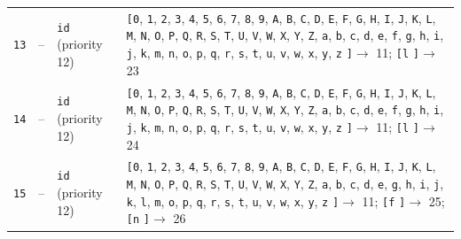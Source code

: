\documentclass[11pt,a4paper]{article}
\newcommand{\opensymbolset}{\texttt{[}}
\newcommand{\closesymbolset}{\texttt{]}}
\begin{document}
\begin{landscape}
\begin{longtable}{
    >{\centering\arraybackslash}p{0.8cm}
    >{\centering\arraybackslash}p{0.7cm}
    >{\raggedright\arraybackslash}p{3.7cm}
    >{\raggedright\arraybackslash}p{18.1cm}
}
\texttt{13} & -- & \texttt{id} (priority 12) & \opensymbolset \texttt{0}, \texttt{1}, \texttt{2}, \texttt{3}, \texttt{4}, \texttt{5}, \texttt{6}, \texttt{7}, \texttt{8}, \texttt{9}, \texttt{A}, \texttt{B}, \texttt{C}, \texttt{D}, \texttt{E}, \texttt{F}, \texttt{G}, \texttt{H}, \texttt{I}, \texttt{J}, \texttt{K}, \texttt{L}, \texttt{M}, \texttt{N}, \texttt{O}, \texttt{P}, \texttt{Q}, \texttt{R}, \texttt{S}, \texttt{T}, \texttt{U}, \texttt{V}, \texttt{W}, \texttt{X}, \texttt{Y}, \texttt{Z}, \texttt{a}, \texttt{b}, \texttt{c}, \texttt{d}, \texttt{e}, \texttt{f}, \texttt{g}, \texttt{h}, \texttt{i}, \texttt{j}, \texttt{k}, \texttt{m}, \texttt{n}, \texttt{o}, \texttt{p}, \texttt{q}, \texttt{r}, \texttt{s}, \texttt{t}, \texttt{u}, \texttt{v}, \texttt{w}, \texttt{x}, \texttt{y}, \texttt{z} \closesymbolset $\to$ 11; \opensymbolset \texttt{l} \closesymbolset $\to$ 23 \\
\texttt{14} & -- & \texttt{id} (priority 12) & \opensymbolset \texttt{0}, \texttt{1}, \texttt{2}, \texttt{3}, \texttt{4}, \texttt{5}, \texttt{6}, \texttt{7}, \texttt{8}, \texttt{9}, \texttt{A}, \texttt{B}, \texttt{C}, \texttt{D}, \texttt{E}, \texttt{F}, \texttt{G}, \texttt{H}, \texttt{I}, \texttt{J}, \texttt{K}, \texttt{L}, \texttt{M}, \texttt{N}, \texttt{O}, \texttt{P}, \texttt{Q}, \texttt{R}, \texttt{S}, \texttt{T}, \texttt{U}, \texttt{V}, \texttt{W}, \texttt{X}, \texttt{Y}, \texttt{Z}, \texttt{a}, \texttt{b}, \texttt{c}, \texttt{d}, \texttt{e}, \texttt{f}, \texttt{g}, \texttt{h}, \texttt{i}, \texttt{j}, \texttt{k}, \texttt{m}, \texttt{n}, \texttt{o}, \texttt{p}, \texttt{q}, \texttt{r}, \texttt{s}, \texttt{t}, \texttt{u}, \texttt{v}, \texttt{w}, \texttt{x}, \texttt{y}, \texttt{z} \closesymbolset $\to$ 11; \opensymbolset \texttt{l} \closesymbolset $\to$ 24 \\
\texttt{15} & -- & \texttt{id} (priority 12) & \opensymbolset \texttt{0}, \texttt{1}, \texttt{2}, \texttt{3}, \texttt{4}, \texttt{5}, \texttt{6}, \texttt{7}, \texttt{8}, \texttt{9}, \texttt{A}, \texttt{B}, \texttt{C}, \texttt{D}, \texttt{E}, \texttt{F}, \texttt{G}, \texttt{H}, \texttt{I}, \texttt{J}, \texttt{K}, \texttt{L}, \texttt{M}, \texttt{N}, \texttt{O}, \texttt{P}, \texttt{Q}, \texttt{R}, \texttt{S}, \texttt{T}, \texttt{U}, \texttt{V}, \texttt{W}, \texttt{X}, \texttt{Y}, \texttt{Z}, \texttt{a}, \texttt{b}, \texttt{c}, \texttt{d}, \texttt{e}, \texttt{g}, \texttt{h}, \texttt{i}, \texttt{j}, \texttt{k}, \texttt{l}, \texttt{m}, \texttt{o}, \texttt{p}, \texttt{q}, \texttt{r}, \texttt{s}, \texttt{t}, \texttt{u}, \texttt{v}, \texttt{w}, \texttt{x}, \texttt{y}, \texttt{z} \closesymbolset $\to$ 11; \opensymbolset \texttt{f} \closesymbolset $\to$ 25; \opensymbolset \texttt{n} \closesymbolset $\to$ 26 \\

\end{longtable}
\end{landscape}
\end{document}
